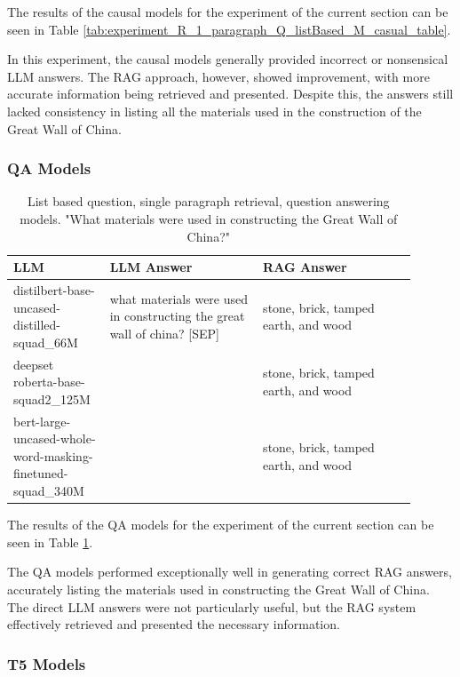 \documentclass{wseas}
\begin{document}
The results of the causal models for the experiment of the current section can be seen 
in Table \ref{tab:experiment_R_1_paragraph_Q_listBased_M_casual_table}.

In this experiment, the causal models generally provided incorrect or
nonsensical LLM answers. The RAG approach, however, showed improvement,
with more accurate information being retrieved and presented. Despite
this, the answers still lacked consistency in listing all the materials
used in the construction of the Great Wall of China.

\subsubsection{QA Models}

\begin{table}[htbp]
  \centering
  \caption{List based question, single paragraph retrieval, question answering models. "What materials were used in constructing the Great Wall of China?"} %
  \label{tab:experiment_R_1_paragraph_Q_listBased_M_QaModels_table}  %
  \begin{tabular}{|p{0.20\linewidth}|p{0.35\linewidth}|p{0.35\linewidth}|}
    \hline
    \textbf{LLM} & \textbf{LLM Answer} & \textbf{RAG Answer} \\
    \hline
    distilbert-base-uncased-distilled-squad\_66M & what materials were used in constructing the great wall of china? {[}SEP{]} & stone, brick, tamped earth, and wood \\
    \hline
    deepset roberta-base-squad2\_125M & & stone, brick, tamped earth, and wood \\
    \hline
    bert-large-uncased-whole-word-masking-finetuned-squad\_340M & & stone, brick, tamped earth, and wood \\
    \hline
  \end{tabular}
\end{table}

The results of the QA models for the experiment of the current section
can be seen in Table \ref{tab:experiment_R_1_paragraph_Q_listBased_M_QaModels_table}.

The QA models performed exceptionally well in generating correct RAG
answers, accurately listing the materials used in constructing the Great
Wall of China. The direct LLM answers were not particularly useful, but
the RAG system effectively retrieved and presented the necessary
information.

\subsubsection{T5 Models}
\end{document}
